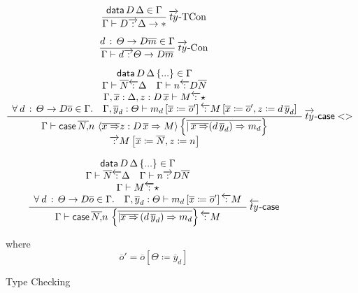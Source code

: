 \begin{figure}
\[
\frac{\mathsf{data}\,D\,\Delta\in\Gamma}{\Gamma\vdash D\overrightarrow{\,:\,}\Delta\rightarrow*}\operatorname{\overrightarrow{ty}-TCon}
\]

\[
\frac{d\,:\,\varTheta\rightarrow D\overline{m}\in\Gamma}{\Gamma\vdash d\overrightarrow{\,:\,}\varTheta\rightarrow D\overline{m}}\operatorname{\overrightarrow{ty}-Con}
\]

\[
\frac{\begin{array}{c}
\mathsf{data}\,D\,\Delta\left\{ ...\right\} \in\Gamma\\
\Gamma\vdash\overline{N}\overleftarrow{\,:\,}\Delta\quad\Gamma\vdash n\overleftarrow{\,:\,}D\overline{N}\\
\Gamma,\overline{x}:\Delta,z:D\,\overline{x}\vdash M\overleftarrow{\,:\,}\star\\
\forall\:d\,:\,\varTheta\rightarrow D\overline{o}\in\Gamma.\quad\Gamma,\overline{y}_{d}:\varTheta\vdash m_{d}\left[\overline{x}\coloneqq\overline{o}'\right]\overleftarrow{\,:\,}M\left[\overline{x}\coloneqq\overline{o}',z\coloneqq d\,\overline{y}_{d}\right]
\end{array}}{\begin{array}{c}
\Gamma\vdash \mathsf{case}{} \,\overline{N,}n\,\left\langle \overline{x\Rightarrow}z:D\,\overline{x}\Rightarrow M\right\rangle \left\{ \overline{|\,\overline{x\Rightarrow}(d\,\overline{y}_{d})\Rightarrow m_{d}}\right\} \\
\overrightarrow{\,:\,}M\left[\overline{x}\coloneqq\overline{N},z\coloneqq n\right]
\end{array}
}\operatorname{\overrightarrow{ty}-\mathsf{case}{}<>}
\]

\[
\frac{\begin{array}{c}
\mathsf{data}\,D\,\Delta\left\{ ...\right\} \in\Gamma\\
\Gamma\vdash\overline{N}\overleftarrow{\,:\,}\Delta\quad\Gamma\vdash n\overrightarrow{\,:\,}D\overline{N}\\
\Gamma\vdash M\overleftarrow{\,:\,}\star\\
\forall\:d\,:\,\varTheta\rightarrow D\overline{o}\in\Gamma.\quad\Gamma,\overline{y}_{d}:\varTheta\vdash m_{d}\left[\overline{x}\coloneqq\overline{o}'\right]\overleftarrow{\,:\,}M
\end{array}}{
  \Gamma\vdash \mathsf{case}{} \,\overline{N,}n\,\left\{ \overline{|\overline{x\Rightarrow}\,(d\,\overline{y}_{d})\Rightarrow m_{d}}\right\} \overleftarrow{\,:\,}M
}\operatorname{\overleftarrow{ty}-\mathsf{case}{}}
\]

where 
\[
\overline{o}'= \overline{o}\left[\varTheta \coloneqq \overline{y}_{d} \right]
\]
\caption{\SLang{} \Bidir{} Type Checking }
\label{fig:surface-data-bi-ty}
\end{figure}

